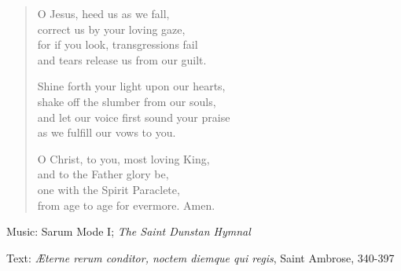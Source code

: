 \hymn



\setlength{\vleftmargin}{2em}
\begin{verse}




O Jesus, heed us as we fall,\\
correct us by your loving gaze,\\
for if you look, transgressions fail\\
and tears release us from our guilt.

Shine forth your light upon our hearts,\\
shake off the slumber from our souls,\\
and let our voice first sound your praise\\
as we fulfill our vows to you.

O Christ, to you, most loving King,\\
and to the Father glory be,\\
one with the Spirit Paraclete,\\
from age to age for evermore. Amen.
\end{verse}
\setlength{\vleftmargin}{\defleftmargini}

\begin{hymnsource}
Music: Sarum Mode I; \emph{The Saint Dunstan Hymnal}

Text: \emph{Æterne rerum conditor, noctem diemque qui regis}, Saint Ambrose, 340-397
\end{hymnsource}
